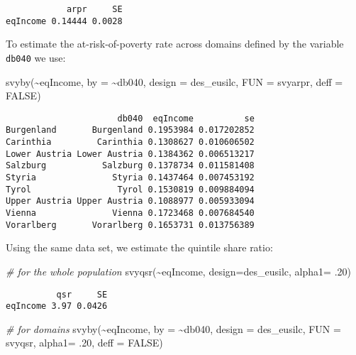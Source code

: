 \documentclass[
]{book}
\newenvironment{Shaded}{\begin{snugshade}}{\end{snugshade}}
\newcommand{\AttributeTok}[1]{\textcolor[rgb]{0.77,0.63,0.00}{#1}}
\newcommand{\CommentTok}[1]{\textcolor[rgb]{0.56,0.35,0.01}{\textit{#1}}}
\newcommand{\ConstantTok}[1]{\textcolor[rgb]{0.00,0.00,0.00}{#1}}
\newcommand{\DecValTok}[1]{\textcolor[rgb]{0.00,0.00,0.81}{#1}}
\newcommand{\FunctionTok}[1]{\textcolor[rgb]{0.00,0.00,0.00}{#1}}
\newcommand{\NormalTok}[1]{#1}
\newcommand{\SpecialCharTok}[1]{\textcolor[rgb]{0.00,0.00,0.00}{#1}}
\begin{document}
\begin{verbatim}
            arpr     SE
eqIncome 0.14444 0.0028
\end{verbatim}

To estimate the at-risk-of-poverty rate across domains defined by the variable \texttt{db040} we use:

\begin{Shaded}
\begin{Highlighting}[]
\FunctionTok{svyby}\NormalTok{(}\SpecialCharTok{\textasciitilde{}}\NormalTok{eqIncome, }\AttributeTok{by =} \SpecialCharTok{\textasciitilde{}}\NormalTok{db040, }\AttributeTok{design =}\NormalTok{ des\_eusilc, }\AttributeTok{FUN =}\NormalTok{ svyarpr, }\AttributeTok{deff =} \ConstantTok{FALSE}\NormalTok{)}
\end{Highlighting}
\end{Shaded}

\begin{verbatim}
                      db040  eqIncome          se
Burgenland       Burgenland 0.1953984 0.017202852
Carinthia         Carinthia 0.1308627 0.010606502
Lower Austria Lower Austria 0.1384362 0.006513217
Salzburg           Salzburg 0.1378734 0.011581408
Styria               Styria 0.1437464 0.007453192
Tyrol                 Tyrol 0.1530819 0.009884094
Upper Austria Upper Austria 0.1088977 0.005933094
Vienna               Vienna 0.1723468 0.007684540
Vorarlberg       Vorarlberg 0.1653731 0.013756389
\end{verbatim}

Using the same data set, we estimate the quintile share ratio:

\begin{Shaded}
\begin{Highlighting}[]
\CommentTok{\# for the whole population}
\FunctionTok{svyqsr}\NormalTok{(}\SpecialCharTok{\textasciitilde{}}\NormalTok{eqIncome, }\AttributeTok{design=}\NormalTok{des\_eusilc, }\AttributeTok{alpha1=}\NormalTok{ .}\DecValTok{20}\NormalTok{)}
\end{Highlighting}
\end{Shaded}

\begin{verbatim}
          qsr     SE
eqIncome 3.97 0.0426
\end{verbatim}

\begin{Shaded}
\begin{Highlighting}[]
\CommentTok{\# for domains}
\FunctionTok{svyby}\NormalTok{(}\SpecialCharTok{\textasciitilde{}}\NormalTok{eqIncome, }\AttributeTok{by =} \SpecialCharTok{\textasciitilde{}}\NormalTok{db040, }\AttributeTok{design =}\NormalTok{ des\_eusilc,}
      \AttributeTok{FUN =}\NormalTok{ svyqsr, }\AttributeTok{alpha1=}\NormalTok{ .}\DecValTok{20}\NormalTok{, }\AttributeTok{deff =} \ConstantTok{FALSE}\NormalTok{)}
\end{Highlighting}
\end{Shaded}
\end{document}
